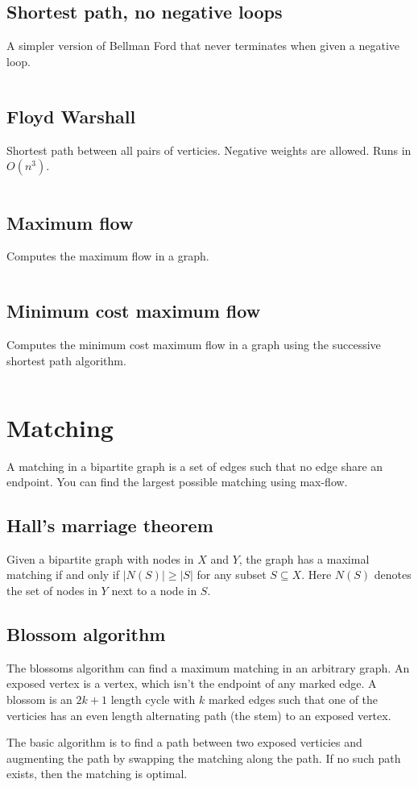 \documentclass[10pt,a4paper,landscape,oneside]{amsart}
\newcommand{\code}[1]{\inputminted[fontsize=\large,tabsize=2,baselinestretch=1]{java}{#1}}
\begin{document}
\begin{multicols*}{2}
\subsection{Shortest path, no negative loops}
A simpler version of Bellman Ford that never terminates when given a negative loop.
\code{graph/shortest-path-noloop.java}
\subsection{Floyd Warshall}
Shortest path between all pairs of verticies. Negative weights are allowed. Runs in
\(O(n^3)\).
\code{graph/floyd-warshall.java}
\subsection{Maximum flow}
Computes the maximum flow in a graph.
\code{graph/max-flow.java}
\subsection{Minimum cost maximum flow}
Computes the minimum cost maximum flow in a graph using the successive shortest path
algorithm.
\code{graph/min-cost-max-flow.java}

\section{Matching}
A matching in a bipartite graph is a set of edges such that no edge share an endpoint.
You can find the largest possible matching using max-flow.
\subsection{Hall's marriage theorem}
Given a bipartite graph with nodes in \(X\) and \(Y\), the graph has a maximal matching
if and only if \(|N(S)| \geq |S|\) for any subset \(S \subseteq X\). Here \(N(S)\)
denotes the set of nodes in \(Y\) next to a node in \(S\).
\subsection{Blossom algorithm}
The blossoms algorithm can find a maximum matching in an arbitrary graph. An exposed
vertex is a vertex, which isn't the endpoint of any marked edge. A blossom is an
\(2k+1\) length cycle with \(k\) marked edges such that one of the verticies has an even
length alternating path (the stem) to an exposed vertex.

The basic algorithm is to find a path between two exposed verticies and augmenting the
path by swapping the matching along the path. If no such path exists, then the matching
is optimal.


\end{multicols*}
\end{document}
